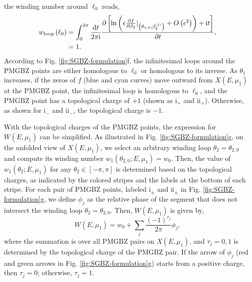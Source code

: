 the winding number around $\ell_{0}$ reads, 
\begin{align}
w_{\text{loop}}\left(\ell_{0}\right) & =\int_{0}^{2\pi}\frac{\mathrm{d} t}{2\pi\mathrm{i}}\frac{\partial\left[\ln\left(\epsilon\frac{\partial f}{\partial\beta_{2}}|_{\left(\theta_{1,0},\beta_{2}^{(j)}\right)}+O\left(\epsilon^{2}\right)\right)+\mathrm{i} t\right]}{\partial t},\nonumber \\
 & =1.
\end{align}
According to Fig. \ref{fig:SGBZ-formulation}f, the infinitesimal
loops around the PMGBZ points are either homologous to $\ell_{0}$
or homologous to its inverse. As $\theta_{1}$ increases, if the zeros
of $f$ (blue and cyan curves) move outward from $X(E,\mu_{1})$ at
the PMGBZ point, the infinitesimal loop is homologous to $\ell_{0}$,
and the PMGBZ point has a topological charge of $+1$ (shown as $\text{i}_{+}$
and $\text{ii}_{+}$). Otherwise, as shown for $\text{i}_{-}$ and
$\text{ii}_{-}$, the topological charge is $-1$.

With the topological charges of the PMGBZ points, the expression for
$W(E,\mu_{1})$ can be simplified. As illustrated in Fig. \ref{fig:SGBZ-formulation}g,
on the unfolded view of $X(E,\mu_{1})$, we select an arbitrary winding
loop $\theta_{2}=\theta_{2,0}$ and compute its winding number $w_{1}(\theta_{2,0};E,\mu_{1})=w_{0}$.
Then, the value of $w_{1}(\theta_{2};E,\mu_{1})$ for any $\theta_{2}\in[-\pi,\pi]$
is determined based on the topological charges, as indicated by the
colored stripes and the labels at the bottom of each stripe. For each
pair of PMGBZ points, labeled $\text{i}_{\pm}$ and $\text{ii}_{\pm}$
in Fig. \ref{fig:SGBZ-formulation}g, we define $\phi_{j}$ as the
relative phase of the segment that does not intersect the winding
loop $\theta_{2}=\theta_{2,0}$. Then, $W(E,\mu_1)$ is
given by, 
\begin{equation}
W\left(E,\mu_{1}\right)=w_{0}+\sum_{j}\frac{\left(-1\right)^{\tau_{j}}}{2\pi}\phi_{j}, \label{eq:W-eq-simplified}
\end{equation}
where the summation is over all PMGBZ pairs on $X(E,\mu_{1})$, and
$\tau_{j}=0,1$ is determined by the topological charge of the PMGBZ
pair. If the arrow of $\phi_{j}$ (red and green arrows in Fig. \ref{fig:SGBZ-formulation}g)
starts from a positive charge, then $\tau_{j}=0$; otherwise, $\tau_{j}=1$.

